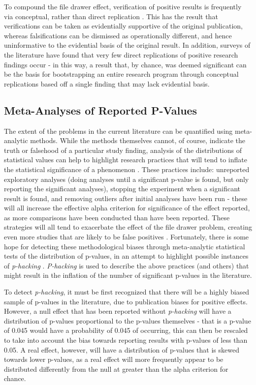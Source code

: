 \documentclass[12pt,a4paper,titlepage]{scrreprt}
\begin{document}
To compound the file drawer effect, verification of positive results is frequently via conceptual, rather than direct replication \parencite{pashler_is_2012}. This has the result that verifications can be taken as evidentially supportive of the original publication, whereas falsifications can be dismissed as operationally different, and hence uninformative to the evidential basis of the original result. In addition, surveys of the literature have found that very few direct replications of positive research findings occur \parencite{makel_replications_2012} - in this way, a result that, by chance, was deemed significant can be the basis for bootstrapping an entire research program through conceptual replications based off a single finding that may lack evidential basis.

\subsection{Meta-Analyses of Reported P-Values}
The extent of the problems in the current literature can be quantified using meta-analytic methods. While the methods themselves cannot, of course, indicate the truth or falsehood of a particular study finding, analysis of the distributions of statistical values can help to highlight research practices that will tend to inflate the statistical significance of a phenomenon \parencite{john_measuring_2012}. These practices include: unreported exploratory analyses (doing analyses until a significant p-value is found, but only reporting the significant analyses), stopping the experiment when a significant result is found, and removing outliers after initial analyses have been run - these will all increase the effective alpha criterion for significance of the effect reported, as more comparisons have been conducted than have been reported. These strategies will all tend to exacerbate the effect of the file drawer problem, creating even more studies that are likely to be false positives \parencite{bakker_rules_2012}.
Fortunately, there is some hope for detecting these methodological biases through meta-analytic statistical tests of the distribution of p-values, in an attempt to highlight possible instances of \textit{p-hacking} \parencite{simonsohn_p-curve:_2013}. \textit{P-hacking} is used to describe the above practices (and others) that might result in the inflation of the number of significant p-values in the literature.

To detect \textit{p-hacking}, it must be first recognized that there will be a highly biased sample of p-values in the literature, due to publication biases for positive effects. However, a null effect that has been reported without \textit{p-hacking} will have a distribution of p-values proportional to the p-values themselves - that is a p-value of 0.045 would have a probability of 0.045 of occurring, this can then be rescaled to take into account the bias towards reporting results with p-values of less than 0.05. A real effect, however, will have a distribution of p-values that is skewed towards lower p-values, as a real effect will more frequently appear to be distributed differently from the null at greater than the alpha criterion for chance.
\end{document}
